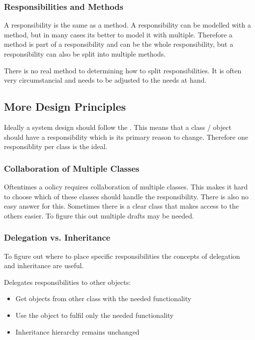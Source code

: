 \documentclass[
../../Software_Engineering_Summary.tex,
]
{subfiles}
\begin{document}
\subsubsection{Responsibilities and Methods}
A responsibility is  the same as a method. A responsibility can be modelled with a method, but in many cases its better to model it with multiple. Therefore a method is part of a responsibility and can be the whole responsibility, but a responsibility can also be split into multiple methods.

There is no real method to determining how to split responsibilities. It is often very circumstancial and needs to be adjusted to the needs at hand.

\subsection{More Design Principles}
Ideally a system design should follow the . This means that a class / object should have a responsibility which is its primary reason to change. Therefore one responsiblity per class is the ideal.

\subsubsection{Collaboration of Multiple Classes}
Oftentimes a oolicy requires collaboration of multiple classes. This makes it hard to choose which of these classes should handle the responsibility. There is also no easy answer for this. Sometimes there is a clear class that makes access to the others easier. To figure this out multiple drafts may be needed.

\subsubsection{Delegation vs. Inheritance}
To figure out where to place specific responsibilities the concepts of delegation and inheritance are useful. 

\begin{defbox}
    [Delegation]
    Delegates responsibilities to other objects:
    \begin{itemize}
        \item Get objects from other class with the needed functionality
        \item Use the object to fulfil only the needed functionality
        \item Inheritance hierarchy remains unchanged
    \end{itemize}
\end{defbox}
\end{document}
